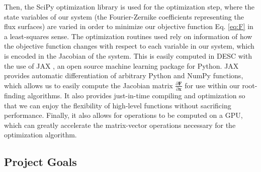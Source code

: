 \documentclass{article}
\begin{document}
Then, the SciPy \cite{SciPy} optimization library is used for the optimization step, where the state variables of our system (the Fourier-Zernike coefficients representing the flux surfaces) are varied in order to minimize our objective function Eq. \eqref{eq:F} in a least-squares sense.
The optimization routines used rely on information of how the objective function changes with respect to each variable in our system, which is encoded in the Jacobian of the system. This is easily computed in DESC with the use of JAX \cite{JAX}, an open source machine learning package for Python.
JAX provides automatic differentiation of arbitrary Python and NumPy functions, which allows us to easily compute the Jacobian matrix $\frac{\partial\mathbf{F}}{\partial\mathbf{x}}$ for use within our root-finding algorithms.
It also provides just-in-time compiling and optimization so that we can enjoy the flexibility of high-level functions without sacrificing performance. Finally, it also allows for operations to be computed on a GPU, which can greatly accelerate the matrix-vector operations necessary for the optimization algorithm.

\subsection{Project Goals}
\end{document}
